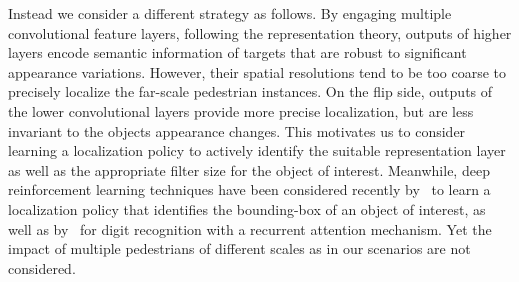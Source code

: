 \documentclass[10pt,journal,compsoc,twoside]{IEEEtran}
\begin{document}
Instead we consider a different strategy as follows.
By engaging multiple convolutional feature layers, following the representation theory, outputs of higher layers encode semantic information of targets that are robust to significant appearance variations. However, their spatial resolutions tend to be too coarse to precisely localize the far-scale pedestrian instances. On the flip side, outputs of the lower convolutional layers provide more precise localization, but are less invariant to the objects appearance changes. This motivates us to consider learning a localization policy to actively identify the suitable representation layer as well as the appropriate filter size for the object of interest.
%
Meanwhile, deep reinforcement learning techniques have been considered recently by~\cite{CaiLaz:iccv15,JieEtAl:NIPS16} to learn a localization policy that identifies the bounding-box of an object of interest, as well as by~\cite{MnihEtAl:nips14} for digit recognition with a recurrent attention mechanism.
Yet the impact of multiple pedestrians of different scales as in our scenarios are not considered.
\end{document}
